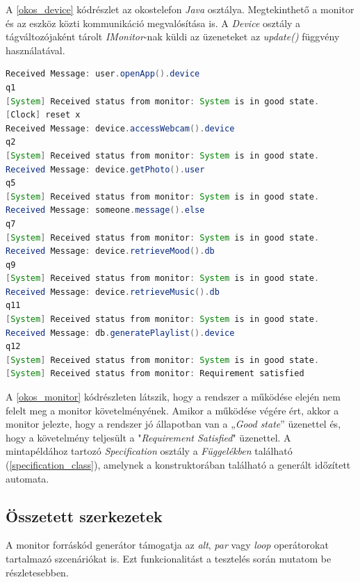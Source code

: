 A \ref{okos_device} kódrészlet az okostelefon \textit{Java} osztálya.
Megtekinthető a monitor és az eszköz közti kommunikáció megvalósítása is.
A \textit{Device} osztály a tágváltozójaként tárolt \textit{IMonitor}-nak küldi az üzeneteket az \textit{update()} függvény használatával.

\begin{lstlisting}[language=java, frame=single, float=ht!, caption={Monitor kimenete a rendszer működésének egyes fázisaiban.},captionpos=b,label=okos_monitor]
Received Message: user.openApp().device
q1
[System] Received status from monitor: System is in good state.
[Clock] reset x
Received Message: device.accessWebcam().device
q2
[System] Received status from monitor: System is in good state.
Received Message: device.getPhoto().user
q5
[System] Received status from monitor: System is in good state.
Received Message: someone.message().else
q7
[System] Received status from monitor: System is in good state.
Received Message: device.retrieveMood().db
q9
[System] Received status from monitor: System is in good state.
Received Message: device.retrieveMusic().db
q11
[System] Received status from monitor: System is in good state.
Received Message: db.generatePlaylist().device
q12
[System] Received status from monitor: System is in good state.
[System] Received status from monitor: Requirement satisfied
\end{lstlisting}

A \ref{okos_monitor} kódrészleten látszik, hogy a rendszer a működése elején nem felelt meg a monitor követelményének.
Amikor a működése végére ért, akkor a monitor jelezte, hogy a rendszer jó állapotban van a „\textit{Good state}” üzenettel és, hogy a követelmény teljesült a "\textit{Requirement Satisfied}" üzenettel.
A mintapéldához tartozó \textit{Specification} osztály a \textit{Függelékben} található (\ref{specification_class}), amelynek a konstruktorában található a generált időzített automata.

\clearpage\subsection{Összetett szerkezetek}

A monitor forráskód generátor támogatja az \textit{alt}, \textit{par} vagy \textit{loop} operátorokat tartalmazó szcenáriókat is.
Ezt funkcionalitást a tesztelés során mutatom be részletesebben.


